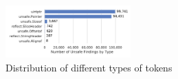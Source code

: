 \begin{figure}[!t]
    \vspace{-12pt}
    \centering
    \includegraphics[width=0.43\textwidth]{gfx/figures/distribution-unsafe-types-pdf.pdf}
    \caption{Distribution of different types of \unsafe{} tokens}
    \label{fig:unsafe-tokens-distribution}
\end{figure}